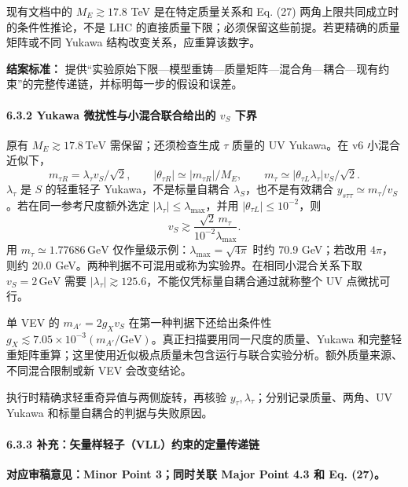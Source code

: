 \documentclass[
]{article}
\begin{document}
现有文档中的 \(M_E\gtrsim17.8\) TeV 是在特定质量关系和 Eq. (27)
两角上限共同成立时的条件性推论，不是 LHC
的直接质量下限；必须保留这些前提。若更精确的质量矩阵或不同 Yukawa
结构改变关系，应重算该数字。

\textbf{结案标准：}
提供``实验原始下限---模型重铸---质量矩阵---混合角---耦合---现有约束''的完整传递链，并标明每一步的假设和误差。

\paragraph{\texorpdfstring{6.3.2 Yukawa 微扰性与小混合联合给出的 \(v_S\)
下界}{6.3.2 Yukawa 微扰性与小混合联合给出的 v\_S 下界}}\label{yukawa-ux5faeux6270ux6027ux4e0eux5c0fux6df7ux5408ux8054ux5408ux7ed9ux51faux7684-v_s-ux4e0bux754c}

原有 \(M_E\gtrsim17.8\,\mathrm{TeV}\) 需保留；还须检查生成 \(\tau\)
质量的 UV Yukawa。在 v6 小混合近似下， \[
m_{\tau R}=\lambda_\tau v_S/\sqrt2,\qquad
|\theta_{\tau R}|\simeq|m_{\tau R}|/M_E,\qquad
m_\tau\simeq|\theta_{\tau L}\lambda_\tau|v_S/\sqrt2.
\] \(\lambda_\tau\) 是 \(S\) 的轻重轻子 Yukawa，不是标量自耦合
\(\lambda_S\)，也不是有效耦合
\(y_{s\tau\tau}\simeq m_\tau/v_S\)。若在同一参考尺度额外选定
\(|\lambda_\tau|\le\lambda_{\max}\)，并用
\(|\theta_{\tau L}|\le10^{-2}\)，则 \[
v_S\gtrsim\frac{\sqrt2\,m_\tau}{10^{-2}\lambda_{\max}}.
\] 用 \(m_\tau\simeq1.77686\,\mathrm{GeV}\)
仅作量级示例：\(\lambda_{\max}=\sqrt{4\pi}\) 时约 70.9 GeV；若改用
\(4\pi\)，则约 20.0
GeV。两种判据不可混用或称为实验界。在相同小混合关系下取
\(v_S=2\,\mathrm{GeV}\) 需要
\(|\lambda_\tau|\gtrsim125.6\)，不能仅凭标量自耦合通过就称整个 UV
点微扰可行。

单 VEV 的 \(m_{A'}=2g_Xv_S\) 在第一种判据下还给出条件性
\(g_X\lesssim7.05\times10^{-3}(m_{A'}/\mathrm{GeV})\)。真正扫描要用同一尺度的质量、Yukawa
和完整轻重矩阵重算；这里使用近似极点质量未包含运行与联合实验分析。额外质量来源、不同混合限制或新
VEV 会改变结论。

执行时精确求轻重奇异值与两侧旋转，再核验
\(y_\tau,\lambda_\tau\)；分别记录质量、两角、UV Yukawa
和标量自耦合的判据与失败原因。

\paragraph{6.3.3
补充：矢量样轻子（VLL）约束的定量传递链}\label{ux8865ux5145ux77e2ux91cfux6837ux8f7bux5b50vllux7ea6ux675fux7684ux5b9aux91cfux4f20ux9012ux94fe}

\textbf{对应审稿意见：Minor Point 3；同时关联 Major Point 4.3 和 Eq.
(27)。}
\end{document}
